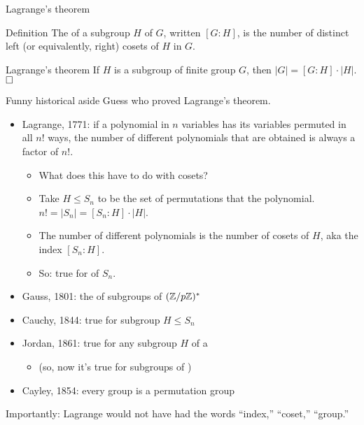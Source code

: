 \documentclass[8pt, handout]{beamer}
\newcommand{\Pause}{\pause}      %
\begin{document}
\begin{frame}{Lagrange's theorem}
  \Pause
  
  \begin{block}{Definition}
    The  of a subgroup $H$ of $G$, written $[G:H]$,
    is the number of distinct left (or equivalently, right) cosets of
    $H$ in $G$.
  \end{block}

  \Pause
  
  \begin{block}{Lagrange's theorem}
    If $H$ is a subgroup of finite group $G$, then $|G|=[G:H]\cdot
    |H|$. $\hfill\Box$
  \end{block}
  
\end{frame}


\begin{frame}{Funny historical aside}
  Guess who proved Lagrange's theorem. \Pause {}

  \begin{itemize}
    \item Lagrange, 1771: if a polynomial in $n$ variables has its variables permuted in all $n!$ ways, the number of different polynomials that are obtained is always a factor of $n!$. \Pause
    \begin{itemize}
      \item What does this have to do with cosets? \Pause
      \item Take $H\leq S_n$ to be the set of permutations that  the polynomial. $n! = |S_n| = [S_n : H] \cdot |H|$. \Pause
      \item The number of different polynomials is the number of cosets of $H$, aka the index $[S_n:H]$.\Pause
      \item So: true for  of $S_n$.\Pause
    \end{itemize}
    \item Gauss, 1801: the  of subgroups of $(\mathbb{Z}/p\mathbb{Z})^*$\Pause
    \item Cauchy, 1844: true for  subgroup $H \leq S_n$\Pause
    \item Jordan, 1861: true for any subgroup $H$ of a \Pause
    \begin{itemize}
      \item (so, now it's true for subgroups of )\Pause
    \end{itemize}
    \item Cayley, 1854: every group is a permutation group\Pause
  \end{itemize}

  Importantly: Lagrange would not have had the words ``index,'' ``coset,'' ``group.''
\end{frame}
\end{document}
